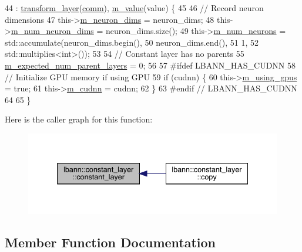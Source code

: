 \begin{DoxyCode}
44     : \hyperlink{classlbann_1_1transform__layer_a4b72501e0f4d0745c8b13c5331055e65}{transform\_layer}(\hyperlink{file__io_8cpp_ab048c6f9fcbcfaa57ce68b00263dbebe}{comm}), \hyperlink{classlbann_1_1constant__layer_a8cdb9c854777cc29f1cf1f60da64ef4e}{m\_value}(value) \{
45 
46     \textcolor{comment}{// Record neuron dimensions}
47     this->\hyperlink{classlbann_1_1Layer_abb34bb8031f57a483e2e327a5f229f48}{m\_neuron\_dims} = neuron\_dims;
48     this->\hyperlink{classlbann_1_1Layer_adfd6178d21498c9095cd947ae1eb2d6a}{m\_num\_neuron\_dims} = neuron\_dims.size();
49     this->\hyperlink{classlbann_1_1Layer_a6b5ebc8a7d9329d8a773ed787e7b41d8}{m\_num\_neurons} = std::accumulate(neuron\_dims.begin(),
50                                           neuron\_dims.end(),
51                                           1,
52                                           std::multiplies<int>());
53 
54     \textcolor{comment}{// Constant layer has no parents}
55     \hyperlink{classlbann_1_1Layer_a841b96b25555247f52921c7f13ae1dfa}{m\_expected\_num\_parent\_layers} = 0;
56 
57 \textcolor{preprocessor}{  #ifdef LBANN\_HAS\_CUDNN}
58     \textcolor{comment}{// Initialize GPU memory if using GPU}
59     \textcolor{keywordflow}{if} (cudnn) \{
60       this->\hyperlink{classlbann_1_1Layer_af7881cb5eff5207c15fa835d65462e8f}{m\_using\_gpus} = \textcolor{keyword}{true};
61       this->\hyperlink{classlbann_1_1Layer_a08dbb94239e3b8c96329786c57c72e21}{m\_cudnn} = cudnn;
62     \}
63 \textcolor{preprocessor}{  #endif // LBANN\_HAS\_CUDNN}
64 
65   \}
\end{DoxyCode}
Here is the caller graph for this function\+:\nopagebreak
\begin{figure}[H]
\begin{center}
\leavevmode
\includegraphics[width=338pt]{classlbann_1_1constant__layer_a00b24316ac4ac313feb751cb00d850fc_icgraph}
\end{center}
\end{figure}


\subsection{Member Function Documentation}
\mbox{\label{classlbann_1_1constant__layer_a88c9fae7cb03b68b9a8b103877ac2c6d}} 
